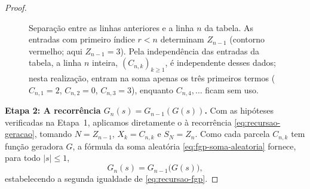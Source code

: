 \documentclass[12pt,portuguese]{article}
\theoremstyle{definition}
\theoremstyle{plainexercise}
\theoremstyle{starredexercise}
\theoremstyle{definition}
\begin{document}
\begin{proof}
\begin{figure}[H]
  \caption{Separação entre as linhas anteriores e a linha $n$ da tabela.
    As entradas com primeiro índice $r<n$ determinam $Z_{n-1}$ (contorno
    vermelho; aqui $Z_{n-1}=3$). Pela independência das entradas da
    tabela, a linha $n$ inteira, $(C_{n,k})_{k\geqslant 1}$, é independente
    desses dados; nesta realização, entram na soma apenas os três primeiros
    termos ($C_{n,1}=2$, $C_{n,2}=0$, $C_{n,3}=3$), enquanto
    $C_{n,4},\ldots$ ficam sem uso.}
  \label{fig:independencia-geracoes}
\end{figure}

\smallskip
\noindent\textbf{Etapa 2: A recorrência $G_n(s)=G_{n-1}(G(s))$.}
Com as hipóteses verificadas na Etapa~1, aplicamos diretamente o
 à recorrência \eqref{eq:recursao-geracao},
tomando $N=Z_{n-1}$, $X_k=C_{n,k}$ e $S_N=Z_n$. Como cada parcela
$C_{n,k}$ tem função geradora $G$, a fórmula da soma aleatória
\eqref{eq:fgp-soma-aleatoria} fornece, para todo $|s|\leqslant 1$,
\begin{equation}\label{eq:passo-recursao}
G_n(s)=G_{n-1}\bigl(G(s)\bigr),
\end{equation}
estabelecendo a segunda igualdade de \eqref{eq:recursao-fgp}.


\end{proof}
\end{document}
